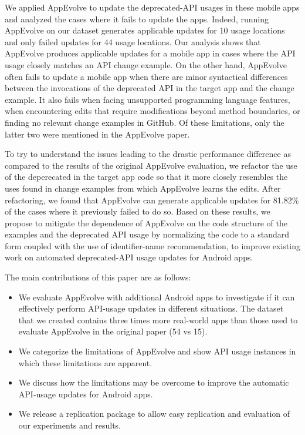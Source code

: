 We applied AppEvolve to update the deprecated-API usages in these mobile
apps and analyzed the cases where it fails to update the apps. Indeed,
running AppEvolve on our dataset generates applicable updates for 10 usage
locations and only failed updates for 44 usage locations. Our analysis
shows that AppEvolve produces applicable updates for a mobile app in cases
where the API usage closely matches an API change example.  On the other
hand, AppEvolve often fails to update a mobile app when there are minor
syntactical differences between the invocations of the deprecated API in
the target app and the change example.  It also fails when facing
unsupported  programming language
features, when encountering edits that require modifications beyond method
boundaries, or finding no relevant change examples in GitHub.  Of these
limitations, only the latter two were mentioned in the AppEvolve paper.

To try to understand the issues leading to the drastic performance
difference as compared to the results of the original AppEvolve evaluation,
we refactor the use of the deperecated in the target app code so that it
more closely resembles the uses found in change examples from which
AppEvolve learns the edits.  After refactoring, we found that AppEvolve can
generate applicable updates for 81.82\% of the cases where it previously
failed to do so.  Based on these results, we propose to mitigate the
dependence of AppEvolve on the code structure of the examples and the
deprecated API usage by normalizing the code to a standard form coupled
with the use of identifier-name recommendation, to improve existing work on
automated deprecated-API usage updates for Android apps.

The main contributions of this paper are as follows:
\begin{itemize}
	\item We  evaluate AppEvolve with additional Android apps to investigate if it can effectively perform API-usage updates in different situations. The dataset that we created contains three times more real-world apps than those used to evaluate AppEvolve in the original paper (54 vs 15).
	\item We categorize the limitations of AppEvolve and show API usage instances in which these limitations are apparent.
	\item We discuss how the limitations may be overcome to improve the automatic API-usage updates for Android apps.
	\item We release a replication package to allow easy replication and evaluation of our experiments and results.%
\end{itemize}

